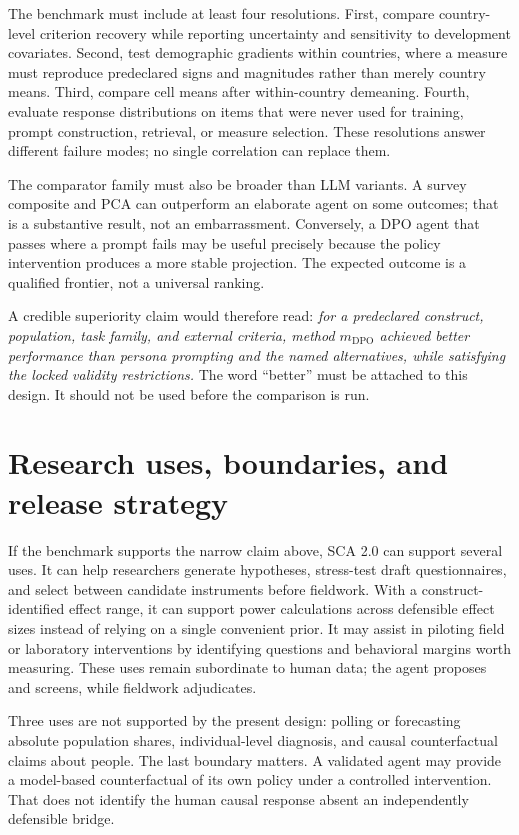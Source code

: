 \documentclass[10pt,letterpaper]{article}
\begin{document}
The benchmark must include at least four resolutions. First, compare country-level criterion recovery while reporting uncertainty and sensitivity to development covariates. Second, test demographic gradients within countries, where a measure must reproduce predeclared signs and magnitudes rather than merely country means. Third, compare cell means after within-country demeaning. Fourth, evaluate response distributions on items that were never used for training, prompt construction, retrieval, or measure selection. These resolutions answer different failure modes; no single correlation can replace them.

The comparator family must also be broader than LLM variants. A survey composite and PCA can outperform an elaborate agent on some outcomes; that is a substantive result, not an embarrassment. Conversely, a DPO agent that passes where a prompt fails may be useful precisely because the policy intervention produces a more stable projection. The expected outcome is a qualified frontier, not a universal ranking.

A credible superiority claim would therefore read: \emph{for a predeclared construct, population, task family, and external criteria, method $m_{\mathrm{DPO}}$ achieved better performance than persona prompting and the named alternatives, while satisfying the locked validity restrictions.} The word ``better'' must be attached to this design. It should not be used before the comparison is run.

\section{Research uses, boundaries, and release strategy}
If the benchmark supports the narrow claim above, SCA 2.0 can support several uses. It can help researchers generate hypotheses, stress-test draft questionnaires, and select between candidate instruments before fieldwork. With a construct-identified effect range, it can support power calculations across defensible effect sizes instead of relying on a single convenient prior. It may assist in piloting field or laboratory interventions by identifying questions and behavioral margins worth measuring. These uses remain subordinate to human data; the agent proposes and screens, while fieldwork adjudicates.

Three uses are not supported by the present design: polling or forecasting absolute population shares, individual-level diagnosis, and causal counterfactual claims about people. The last boundary matters. A validated agent may provide a model-based counterfactual of its own policy under a controlled intervention. That does not identify the human causal response absent an independently defensible bridge.
\end{document}
